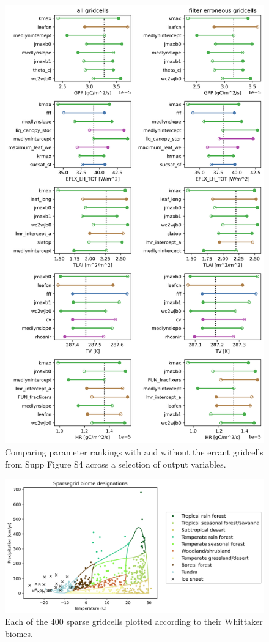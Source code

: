 \documentclass[11pt]{article}
\begin{document}
\begin{figure}[h]
\centering
\includegraphics[width=30pc]{../figs/supp/AF2095_rankings.png}
\caption{Comparing parameter rankings with and without the errant gridcells from Supp Figure S4 across a selection of output variables.}
\label{supp:abug}
\end{figure}


\begin{figure}[h]
\centering
\includegraphics[width=40pc]{../figs/supp/biome_tp.png}
\caption{Each of the 400 sparse gridcells plotted according to their Whittaker biomes.}
\label{supp:whit1}
\end{figure}
\end{document}

